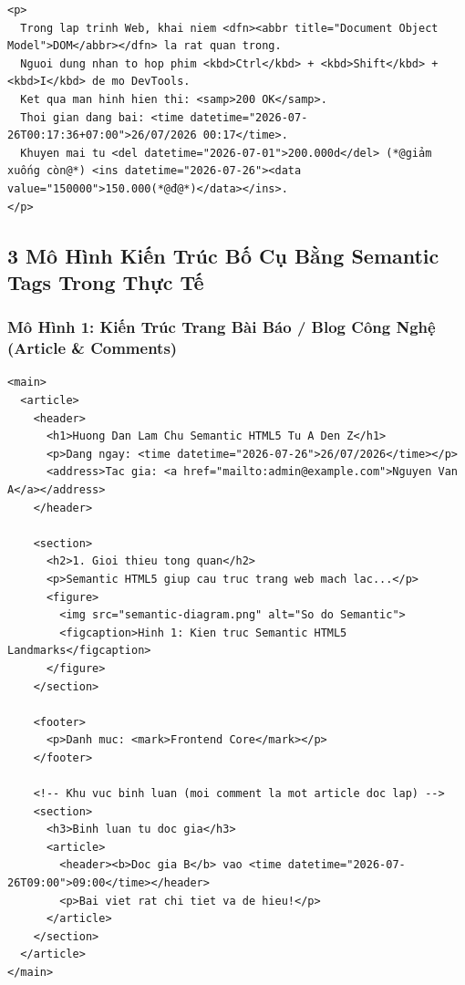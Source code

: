 \documentclass[11pt,oneside]{book}
\begin{document}
\begin{codeWindow}
\begin{lstlisting}[language=HTML5]
<p>
  Trong lap trinh Web, khai niem <dfn><abbr title="Document Object Model">DOM</abbr></dfn> la rat quan trong.
  Nguoi dung nhan to hop phim <kbd>Ctrl</kbd> + <kbd>Shift</kbd> + <kbd>I</kbd> de mo DevTools.
  Ket qua man hinh hien thi: <samp>200 OK</samp>.
  Thoi gian dang bai: <time datetime="2026-07-26T00:17:36+07:00">26/07/2026 00:17</time>.
  Khuyen mai tu <del datetime="2026-07-01">200.000d</del> (*@giảm xuống còn@*) <ins datetime="2026-07-26"><data value="150000">150.000(*@đ@*)</data></ins>.
</p>
\end{lstlisting}
\end{codeWindow}

\clearpage
\subsection{3 Mô Hình Kiến Trúc Bố Cụ Bằng Semantic Tags Trong Thực Tế}

\subsubsection{Mô Hình 1: Kiến Trúc Trang Bài Báo / Blog Công Nghệ (Article \& Comments)}

\begin{codeWindowBreakable}
\begin{lstlisting}[language=HTML5]
<main>
  <article>
    <header>
      <h1>Huong Dan Lam Chu Semantic HTML5 Tu A Den Z</h1>
      <p>Dang ngay: <time datetime="2026-07-26">26/07/2026</time></p>
      <address>Tac gia: <a href="mailto:admin@example.com">Nguyen Van A</a></address>
    </header>

    <section>
      <h2>1. Gioi thieu tong quan</h2>
      <p>Semantic HTML5 giup cau truc trang web mach lac...</p>
      <figure>
        <img src="semantic-diagram.png" alt="So do Semantic">
        <figcaption>Hinh 1: Kien truc Semantic HTML5 Landmarks</figcaption>
      </figure>
    </section>

    <footer>
      <p>Danh muc: <mark>Frontend Core</mark></p>
    </footer>

    <!-- Khu vuc binh luan (moi comment la mot article doc lap) -->
    <section>
      <h3>Binh luan tu doc gia</h3>
      <article>
        <header><b>Doc gia B</b> vao <time datetime="2026-07-26T09:00">09:00</time></header>
        <p>Bai viet rat chi tiet va de hieu!</p>
      </article>
    </section>
  </article>
</main>
\end{lstlisting}
\end{codeWindowBreakable}
\end{document}

